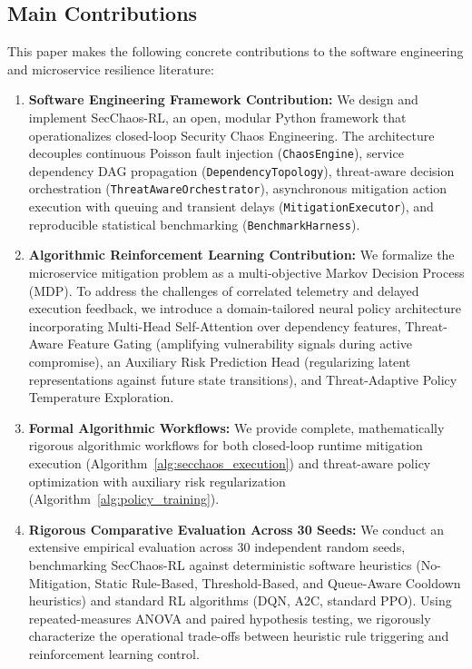 \documentclass[11pt,a4paper]{article}
\begin{document}
\subsection{Main Contributions}
This paper makes the following concrete contributions to the software engineering and microservice resilience literature:
\begin{enumerate}
    \item \textbf{Software Engineering Framework Contribution:} We design and implement SecChaos-RL, an open, modular Python framework that operationalizes closed-loop Security Chaos Engineering. The architecture decouples continuous Poisson fault injection (\texttt{ChaosEngine}), service dependency DAG propagation (\texttt{DependencyTopology}), threat-aware decision orchestration (\texttt{ThreatAwareOrchestrator}), asynchronous mitigation action execution with queuing and transient delays (\texttt{MitigationExecutor}), and reproducible statistical benchmarking (\texttt{BenchmarkHarness}).
    \item \textbf{Algorithmic Reinforcement Learning Contribution:} We formalize the microservice mitigation problem as a multi-objective Markov Decision Process (MDP). To address the challenges of correlated telemetry and delayed execution feedback, we introduce a domain-tailored neural policy architecture incorporating Multi-Head Self-Attention over dependency features, Threat-Aware Feature Gating (amplifying vulnerability signals during active compromise), an Auxiliary Risk Prediction Head (regularizing latent representations against future state transitions), and Threat-Adaptive Policy Temperature Exploration.
    \item \textbf{Formal Algorithmic Workflows:} We provide complete, mathematically rigorous algorithmic workflows for both closed-loop runtime mitigation execution (Algorithm~\ref{alg:secchaos_execution}) and threat-aware policy optimization with auxiliary risk regularization (Algorithm~\ref{alg:policy_training}).
    \item \textbf{Rigorous Comparative Evaluation Across 30 Seeds:} We conduct an extensive empirical evaluation across 30 independent random seeds, benchmarking SecChaos-RL against deterministic software heuristics (No-Mitigation, Static Rule-Based, Threshold-Based, and Queue-Aware Cooldown heuristics) and standard RL algorithms (DQN, A2C, standard PPO). Using repeated-measures ANOVA and paired hypothesis testing, we rigorously characterize the operational trade-offs between heuristic rule triggering and reinforcement learning control.

\end{enumerate}
\end{document}
